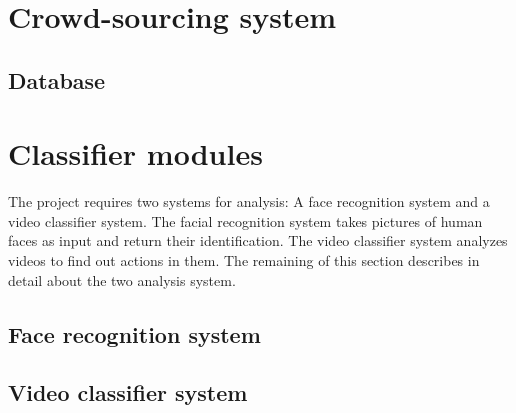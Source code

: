 \section{Crowd-sourcing system}
\subsection{Database}
\section{Classifier modules}
The project requires two systems for analysis: A face recognition system and a video classifier system. The facial recognition system takes pictures of human faces as input and return their identification. The video classifier system analyzes videos to find out actions in them. The remaining of this section describes in detail about the two analysis system.
\subsection{Face recognition system}

\subsection{Video classifier system}
